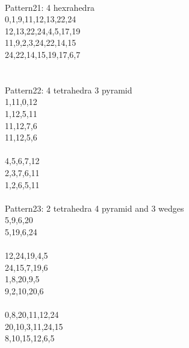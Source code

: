 \documentclass[twocolumn]{article}
\begin{document}
 \\
\tiny  Pattern21: 4 hexrahedra \\
\tiny 0,1,9,11,12,13,22,24  \\
\tiny 12,13,22,24,4,5,17,19 \\
\tiny 11,9,2,3,24,22,14,15  \\
\tiny 24,22,14,15,19,17,6,7 \\
\tiny   \\



 \\
\tiny  Pattern22: 4 tetrahedra 3 pyramid \\
\tiny  1,11,0,12 \\
\tiny  1,12,5,11 \\
\tiny  11,12,7,6 \\
\tiny  11,12,5,6 \\
\tiny   \\
\tiny  4,5,6,7,12 \\
\tiny  2,3,7,6,11 \\
\tiny  1,2,6,5,11 \\

 \\
\tiny  Pattern23: 2 tetrahedra 4 pyramid and 3 wedges\\
\tiny  5,9,6,20 \\
\tiny  5,19,6,24 \\
\tiny   \\
\tiny  12,24,19,4,5 \\
\tiny  24,15,7,19,6 \\
\tiny  1,8,20,9,5 \\
\tiny  9,2,10,20,6 \\
\tiny   \\
\tiny  0,8,20,11,12,24 \\
\tiny  20,10,3,11,24,15 \\
\tiny  8,10,15,12,6,5 \\
\end{document}
